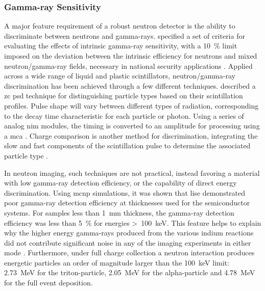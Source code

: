 \documentclass[../../../main.tex]{subfiles}%
\begin{document}
%
    \Xsubsection%
    \subsubsection*{Gamma-ray Sensitivity}%
    \label{sec:chapter-4:semiconductor-response:gamma-ray}%
    A major feature requirement of a robust neutron detector is the ability to discriminate between neutrons and \glspl{gamma-ray}.
    \citeauthor*{Kouzes_2011} specified a set of criteria for evaluating the effects of intrinsic \gls{gamma-ray} sensitivity, with a \SI{10}{\percent} limit imposed on the deviation between the intrinsic efficiency for neutrons and mixed neutron/\gls{gamma-ray} fields, necessary in national security applications \cite{Kouzes_2011}.
    Applied across a wide range of liquid and plastic scintillators, neutron/\gls{gamma-ray} discrimination has been achieved through a few different techniques.
    \citeauthor*{McBeth_1971} described a \gls{zc} \gls{psd} technique for distinguishing particle types based on their scintillation profiles.
    Pulse shape will vary between different types of radiation, corresponding to the decay time characteristic for each particle or photon.
    Using a series of analog \gls{nim} modules, the timing is converted to an amplitude for processing using a \gls{mca} \cite{McBeth_1971}.    
    Charge comparison is another method for discrimination, integrating the slow and fast components of the scintillation pulse to determine the associated particle type \cite{Szczesmak_2014}.
    \par%
    In neutron imaging, such techniques are not practical, instead favoring a material with low \gls{gamma-ray} detection efficiency, or the capability of direct energy discrimination. 
    Using \gls{mcnp} simulations, it was shown that \gls{lise} demonstrated poor \gls{gamma-ray} detection efficiency at thicknesses used for the semiconductor systems.
    For samples less than \SI{1}{\milli\meter} thickness, the \gls{gamma-ray} detection efficiency was less than \SI{5}{\percent} for energies \SI{100}[>]{\kilo\electronvolt}.
    This feature helps to explain why the higher energy \glspl{gamma-ray} produced from the various indium reactions did not contribute significant noise in any of the imaging experiments in either mode \cite{Lukosi_2016}.
    Furthermore, under full charge collection a neutron interaction produces energetic particles an order of magnitude larger than the \SI{100}{\kilo\electronvolt} limit: \SI{2.73}{\mega\electronvolt} for the \gls{triton-particle}, \SI{2.05}{\mega\electronvolt} for the \gls{alpha-particle} and \SI{4.78}{\mega\electronvolt} for the full event deposition.
\end{document}
